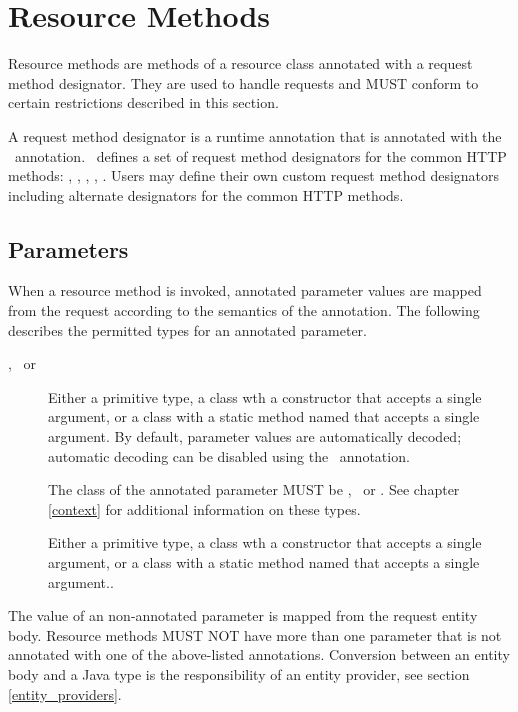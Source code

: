 \section{Resource Methods}
\label{resource_method}

Resource methods are methods of a resource class annotated with a request method designator. They are used to handle requests and MUST conform to certain restrictions described in this section.

A request method designator is a runtime annotation that is annotated with the \HttpMethod\ annotation. \jaxrs\ defines a set of request method designators for the common HTTP methods: , , , , . Users may define their own custom request method designators including alternate designators for the common HTTP methods.

\subsection{Parameters}
\label{resource_method_params}

When a resource method is invoked, annotated parameter values are mapped from the request according to the semantics of the annotation. The following describes the permitted types for an annotated parameter.
\begin{description}
\item[\MatrixParam, \QueryParam\ or \PathParam] Either a primitive type, a class wth a constructor that accepts a single  argument, or a class with a static method named  that accepts a single  argument. By default, parameter values are automatically decoded; automatic decoding can be disabled using the \Encoded\ annotation.
\item[\Context] The class of the annotated parameter MUST be \UriInfo, \Request\ or \HttpHeaders. See chapter \ref{context} for additional information on these types.
\item[\HeaderParam] Either a primitive type, a class wth a constructor that accepts a single  argument, or a class with a static method named  that accepts a single  argument..
\end{description}

The value of an non-annotated  parameter is mapped from the request entity body. Resource methods MUST NOT have more than one parameter that is not annotated with one of the above-listed annotations. Conversion between an entity body and a Java type is the responsibility of an entity provider, see section \ref{entity_providers}.

